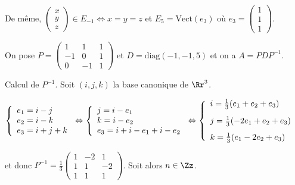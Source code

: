 {{De même,  $\left(\begin{array}{c}
x\\
y\\
z
\end{array}
\right)\in E_{-1}\Leftrightarrow x=y=z$ et $E_5=\text{Vect}(e_3)$ où $e_3=\left(\begin{array}{c}
1\\
1\\
1
\end{array}
\right)$.

On pose $P=\left(
\begin{array}{ccc}
1&1&1\\
-1&0&1\\
0&-1&1
\end{array}
\right)$ et $D=\text{diag}(-1,-1,5)$ et on a $A =PDP^{-1}$.

Calcul de $P^{-1}$. Soit $(i,j,k)$ la base canonique de $\Rr^3$.

\begin{center}
$\left\{
\begin{array}{l}
e_1=i-j\\
e_2=i-k\\
e_3=i+j+k
\end{array}
\right.\Leftrightarrow\left\{
\begin{array}{l}
j=i-e_1\\
k=i-e_2\\
e_3=i+i-e_1+i-e_2
\end{array}
\right.\Leftrightarrow\left\{
\begin{array}{l}
i=\frac{1}{3}(e_1+e_2+e_3)\\
\rule[-4mm]{0mm}{10mm}j=\frac{1}{3}(-2e_1+e_2+e_3)\\
k=\frac{1}{3}(e_1-2e_2+e_3)
\end{array}
\right.$
\end{center}

et donc $P^{-1}=\frac{1}{3}\left(
\begin{array}{ccc}
1&-2&1\\
1&1&-2\\
1&1&1
\end{array}
\right)$. Soit alors $n\in\Zz$.

}}
